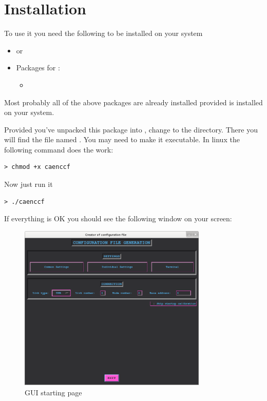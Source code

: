 \section{Installation}
To use it you need the following to be installed on your system
\begin{itemize}
    \item {} or 
    \item Packages for :
            \begin{itemize}
                \item {}
            \end{itemize}
\end{itemize} 
Most probably all of the above packages are already installed provided 
is installed on your system.

Provided you've unpacked this package into , change to the
 directory. There you will find the file named .
You may need to make it executable. In linux the following command does the work:
\begin{lstlisting}
> chmod +x caenccf
\end{lstlisting}
Now just run it
\begin{lstlisting}
> ./caenccf
\end{lstlisting}
If everything is OK you should see the following window on your screen:
\begin{figure}[H]
    \centering
    \includegraphics[width=0.8\textwidth]{../pictures/documentation/gui/start_page.png}
    \caption{GUI starting page}
    \label{fig:gui_stpg}
\end{figure}

